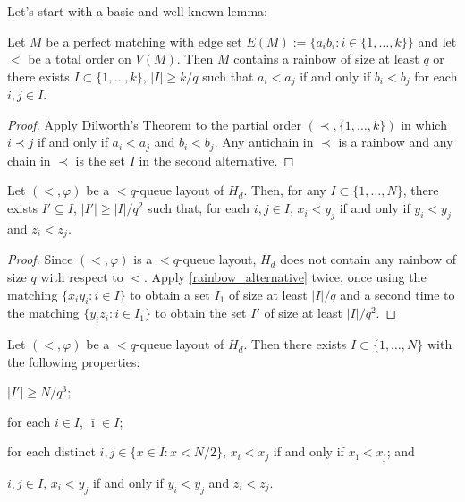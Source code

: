 \documentclass{patmorin}
\begin{document}
Let's start with a basic and well-known lemma:

\begin{lem}\label{rainbow_alternative}
    Let $M$ be a perfect matching with edge set $E(M):=\{a_ib_i:i\in\{1,\ldots,k\}\}$ and let $<$ be a total order on $V(M)$.  Then $M$ contains a rainbow of size at least $q$ or there exists $I\subset\{1,\ldots,k\}$, $|I|\ge k/q$ such that $a_i < a_j$ if and only if $b_i< b_j$ for each $i,j\in I$.
\end{lem}

\begin{proof}
    Apply Dilworth's Theorem to the partial order $(\prec,\{1,\ldots,k\})$ in which $i\prec j$ if and only if $a_i<a_j$ and $b_i < b_j$.  Any antichain in $\prec$ is a rainbow and any chain in $\prec$ is the set $I$ in the second alternative.
\end{proof}


\begin{lem}\label{x-to-z}
    Let $(<,\varphi)$ be a $<q$-queue layout of $H_d$. Then, for any $I\subset\{1,\ldots,N\}$, there exists $I'\subseteq I$, $|I'|\ge|I|/q^2$ such that, for each $i,j\in I$, $x_i<y_j$ if and only if $y_i < y_j$ and $z_i < z_j$.
\end{lem}

\begin{proof}
    Since $(<,\varphi)$ is a $<q$-queue layout, $H_d$ does not contain any rainbow of size $q$ with respect to $<$.  Apply \cref{rainbow_alternative} twice, once using the matching $\{x_iy_i: i\in I\}$ to obtain a set $I_1$ of size at least $|I|/q$ and a second time to the matching $\{y_i z_i: i\in I_1\}$ to obtain the set $I'$ of size at least $|I|/q^2$.
\end{proof}

\begin{lem}
    Let $(<,\varphi)$ be a $<q$-queue layout of $H_d$. Then there exists $I\subset\{1,\ldots,N\}$ with the following properties:
    \begin{compactenum}
        \item $|I'|\ge N/q^3$;
        \item for each $i\in I$, $\overline\imath\in I$;
        \item for each distinct $i,j\in \{x\in I:x < N/2\}$, $x_i < x_j$ if and only if $x_{\overline\imath}< x_{\overline\jmath}$; and
        \item $i,j\in I$, $x_i<y_j$ if and only if $y_i < y_j$ and $z_i < z_j$.
    \end{compactenum}
\end{lem}
\end{document}
